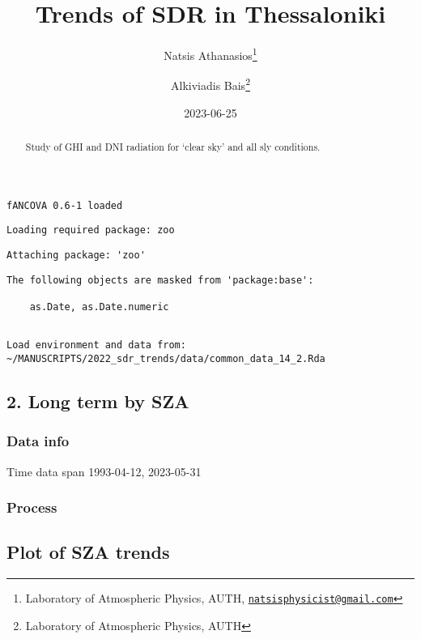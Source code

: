 \documentclass[
  10pt,
  a4paper,oneside]{article}
\title{Trends of SDR in Thessaloniki}
\author{Natsis Athanasios\footnote{Laboratory of Atmospheric Physics, AUTH, \href{mailto:natsisphysicist@gmail.com}{\nolinkurl{natsisphysicist@gmail.com}}} \and Alkiviadis Bais\footnote{Laboratory of Atmospheric Physics, AUTH}}
\date{2023-06-25}
\begin{document}
\maketitle
\begin{abstract}
Study of GHI and DNI radiation for `clear sky' and all sly conditions.
\end{abstract}

{
\hypersetup{linkcolor=}
\setcounter{tocdepth}{4}
\tableofcontents
}
\begin{verbatim}
fANCOVA 0.6-1 loaded
\end{verbatim}

\begin{verbatim}
Loading required package: zoo
\end{verbatim}

\begin{verbatim}
Attaching package: 'zoo'
\end{verbatim}

\begin{verbatim}
The following objects are masked from 'package:base':

    as.Date, as.Date.numeric
\end{verbatim}

\begin{verbatim}

Load environment and data from:  ~/MANUSCRIPTS/2022_sdr_trends/data/common_data_14_2.Rda 
\end{verbatim}

\hypertarget{long-term-by-sza}{%
\subsection{2. Long term by SZA}\label{long-term-by-sza}}

\hypertarget{data-info}{%
\subsubsection{Data info}\label{data-info}}

Time data span 1993-04-12, 2023-05-31

\hypertarget{process}{%
\subsubsection{Process}\label{process}}

\FloatBarrier

\hypertarget{plot-of-sza-trends}{%
\subsection{Plot of SZA trends}\label{plot-of-sza-trends}}
\end{document}
